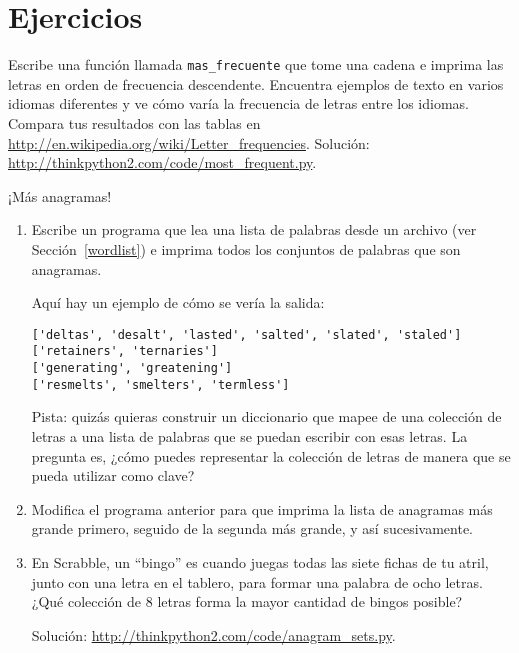\documentclass[10pt]{book}
\begin{document}
\section{Ejercicios}

\begin{exercise}

Escribe una función llamada \verb"mas_frecuente" que tome una cadena e
imprima las letras en orden de frecuencia descendente.  Encuentra ejemplos
de texto en varios idiomas diferentes y ve cómo varía la frecuencia de letras
entre los idiomas.  Compara tus resultados con las tablas en
\url{http://en.wikipedia.org/wiki/Letter_frequencies}.  Solución:
\url{http://thinkpython2.com/code/most_frequent.py}.   

\end{exercise}


\begin{exercise}
\label{anagrams}

¡Más anagramas!

\begin{enumerate}

\item Escribe un programa
que lea una lista de palabras desde un archivo (ver Sección~\ref{wordlist}) e
imprima todos los conjuntos de palabras que son anagramas.

Aquí hay un ejemplo de cómo se vería la salida:

\begin{verbatim}
['deltas', 'desalt', 'lasted', 'salted', 'slated', 'staled']
['retainers', 'ternaries']
['generating', 'greatening']
['resmelts', 'smelters', 'termless']
\end{verbatim}
%
Pista: quizás quieras construir un diccionario que mapee de una
colección de letras a una lista de palabras que se puedan escribir con esas
letras.  La pregunta es, ¿cómo puedes representar la colección de
letras de manera que se pueda utilizar como clave?

\item Modifica el programa anterior para que imprima la lista de anagramas
más grande primero, seguido de la segunda más grande, y así sucesivamente.

\item En Scrabble, un ``bingo'' es cuando juegas todas las siete fichas de
tu atril, junto con una letra en el tablero, para formar una palabra de ocho
letras.  ¿Qué colección de 8 letras forma la mayor cantidad de bingos posible?


Solución: \url{http://thinkpython2.com/code/anagram_sets.py}.

\end{enumerate}
\end{exercise}
\end{document}
